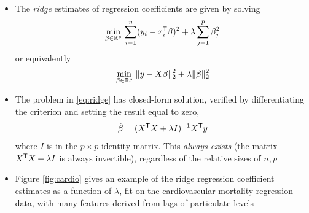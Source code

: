 \documentclass{article}
\begin{document}
\begin{itemize}
\item The \emph{ridge} estimates of regression coefficients are given by solving    
  \[
  \min_{\beta \in \mathbb{R}^p} \, \sum_{i=1}^n (y_i - x_i^{\mathsf{T}} \beta)^2 + \lambda
  \sum_{j=1}^p \beta_j^2
  \]
  or equivalently
  \begin{equation}
  \label{eq:ridge}
  \min_{\beta \in \mathbb{R}^p} \, \|y - X \beta\|_2^2 + \lambda \|\beta\|_2^2
  \end{equation}

\item The problem in \eqref{eq:ridge} has closed-form solution, verified by  
  differentiating the criterion and setting the result equal to zero,
  \begin{equation}
  \label{eq:coef_ridge}
  \hat{\beta} = (X^{\mathsf{T}} X + \lambda I)^{-1} X^{\mathsf{T}} y
  \end{equation}
  where $I$ is in the $p \times p$ identity matrix. This \emph{always exists}
  (the matrix $X^{\mathsf{T}} X + \lambda I$ is always invertible), regardless of the
  relative sizes of $n,p$

\item Figure \ref{fig:cardio} gives an example of the ridge regression
  coefficient estimates as a function of $\lambda$, fit on the cardiovascular 
  mortality regression data, with many features derived from lags of particulate 
  levels 


\end{itemize}
\end{document}
